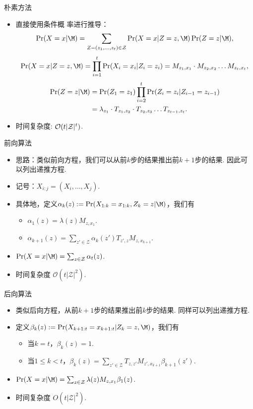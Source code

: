 \begin{frame}{朴素方法}
    \begin{itemize}
    \item 直接使用条件概 率进行推导：
    \[
        \Pr(X=x|\M) =\sum_{Z=(z_1, \dots, z_t) \in \mathcal Z} \Pr(X=x|Z=z, \M)\Pr(Z=z|\M),
    \]
    \[
        \Pr(X=x|Z=z,\M) = \prod_{i=1}^t \Pr(X_i = x_i| Z_i = z_i) = M_{z_1,x_1}\cdot M_{z_2,x_2}\dots M_{z_t,x_t},
    \]
    \begin{align*}
        \Pr(Z=z|\M) &= \Pr(Z_1 = z_1) \prod_{i=2}^t\Pr(Z_i = z_i| Z_{i-1} = z_{i-1}) 
        \\
        &= \lambda_{z_1}\cdot T_{z_1,z_2}\cdot T_{z_2,z_3}\dots T_{z_{t-1},z_t}.
    \end{align*}
    \item 时间复杂度: $\mathcal{O}(t|\mathcal Z|^t)$.
    \end{itemize}
\end{frame}

\begin{frame}{前向算法}
    \begin{itemize}
    \item 思路：类似前向方程，我们可以从前$k$步的结果推出前$k+1$步的结果. 因此可以列出递推方程.
    \item 记号：$X_{i:j}=(X_i,\dots,X_j)$.
    \item 具体地，定义$\alpha_k(z):= \Pr(X_{1:k}=x_{1:k}, Z_k=z| \M)$，我们有
    \begin{itemize}
        \item $\alpha_1(z) = \lambda(z)M_{z,x_1}$.
        \item $\alpha_{k+1}(z) = \sum_{z' \in \mathcal Z}\alpha_{k}(z')T_{z',z}M_{z,x_{k+1}}$.
    \end{itemize}
    \item $\Pr(X=x| \M) = \sum_{z\in \mathcal Z}\alpha_t(z)$.
    \item 时间复杂度 $\mathcal O(t|\mathcal Z|^2)$.
\end{itemize}
\end{frame}


\begin{frame}{后向算法}
   \begin{itemize}
    \item 类似后向方程，从前$k+1$步的结果推出前$k$步的结果. 同样可以列出递推方程.
    \item 定义$\beta_k(z):=\Pr(X_{k+1:t}=x_{k+1:t} | Z_k=z,\M)$，我们有
    \begin{itemize}
        \item 当$k = t$，$\beta_k(z) = 1$.
        \item 当$1 \le k < t$，$\beta_{k}(z) = \sum_{z' \in \mathcal Z}T_{z,z'}M_{z',x_{k+1}}\beta_{k+1}(z')$.
    \end{itemize}
    \item $\Pr(X=x| \M) = \sum_{z\in \mathcal Z}\lambda(z)M_{z,x_1}\beta_1(z)$.
    \item 时间复杂度 $O(t|\mathcal Z|^2)$.
\end{itemize}
\end{frame}


